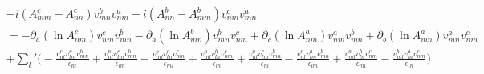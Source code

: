 \documentclass[twocolumn, prx, reprint, amsfonts, amsmath, amssymb, longbibliography, floatfix, aps]{revtex4-2}
\begin{document}
\begin{equation}
	\begin{aligned}
		&-i(A^c_{mm} - A^c_{nn})v^b_{mn} v^{a}_{nm} -i (A^b_{nn} - A^b_{mm})v^c_{nm} v^{a}_{mn} \\
		&= -\partial_a(\ln A^{c}_{nm}) v^c_{nm} v^{b}_{mn} - \partial_a(\ln A^{b}_{mn}) v^b_{mn} v^{c}_{nm} + \partial_c(\ln A^{a}_{nm}) v^a_{nm} v^{b}_{mn} + \partial_b(\ln A^{a}_{mn}) v^a_{mn} v^{c}_{nm} \\
		& + {\textstyle \sum_{l}'} \Big( -\frac{v^c_{nl}v^a_{lm}v^b_{mn}}{\epsilon_{nl}} + \frac{v^a_{nl}v^c_{lm}v^b_{mn}}{\epsilon_{lm}} - \frac{v^b_{ml}v^a_{ln}v^c_{nm}}{\epsilon_{ml}}+ \frac{v^a_{ml}v^b_{ln}v^c_{nm}}{\epsilon_{ln}} 
        + \frac{v^a_{nl}v^c_{lm}v^b_{mn}}{\epsilon_{nl}} - \frac{v^c_{nl}v^a_{lm}v^b_{mn}}{\epsilon_{lm}} + \frac{v^a_{ml}v^b_{ln}v^c_{nm}}{\epsilon_{ml}}- \frac{v^b_{ml}v^a_{ln}v^c_{nm}}{\epsilon_{ln}}\Big)
	\end{aligned}
\end{equation}
\end{document}
